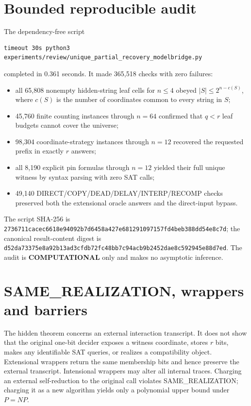 \documentclass[11pt]{article}
\newcommand{\COMP}{\textbf{COMPUTATIONAL}}
\begin{document}
\section{Bounded reproducible audit}

The dependency-free script
\begin{verbatim}
timeout 30s python3 experiments/review/unique_partial_recovery_modelbridge.py
\end{verbatim}
completed in 0.361 seconds.  It made 365,518 checks with zero failures:
\begin{itemize}
\item all 65,808 nonempty hidden-string leaf cells for $n\le4$ obeyed $|S|\le2^{n-c(S)}$, where $c(S)$ is the number of coordinates common to every string in $S$;
\item 45,760 finite counting instances through $n=64$ confirmed that $q<r$ leaf budgets cannot cover the universe;
\item 98,304 coordinate-strategy instances through $n=12$ recovered the requested prefix in exactly $r$ answers;
\item all 8,190 explicit pin formulas through $n=12$ yielded their full unique witness by syntax parsing with zero SAT calls;
\item 49,140 DIRECT/COPY/DEAD/DELAY/INTERP/RECOMP checks preserved both the extensional oracle answers and the direct-input bypass.
\end{itemize}
The script SHA-256 is
\nolinkurl{2736711cacec6618e94092b7d6458a427e681291097157fd4beb388dd54e8c7d};
the canonical result-content digest is
\nolinkurl{d52da73375e8a92b13ad3cfdb72fc48bb7c94acb9b2452dae8c592945e88d7ed}.
The audit is \COMP{} only and makes no asymptotic inference.

\section{SAME\_REALIZATION, wrappers and barriers}

The hidden theorem concerns an external interaction transcript.  It does not show that the original one-bit decider exposes a witness coordinate, stores $r$ bits, makes any identifiable SAT queries, or realizes a compatibility object.  Extensional wrappers return the same membership bits and hence preserve the external transcript.  Intensional wrappers may alter all internal traces.  Charging an external self-reduction to the original call violates SAME\_REALIZATION; charging it as a new algorithm yields only a polynomial upper bound under $P=NP$.
\end{document}
